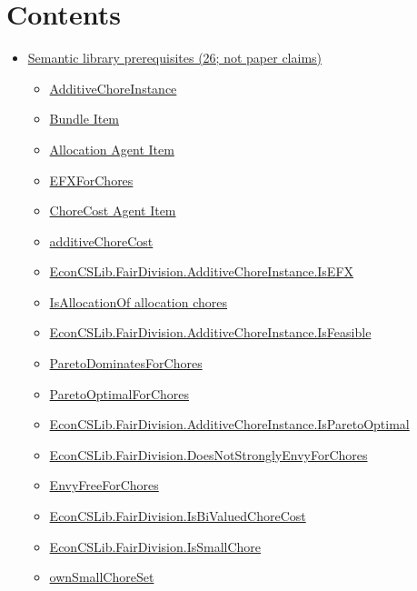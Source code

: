 \documentclass[10pt]{article}
\begin{document}
\section*{Contents}
\begin{itemize}[leftmargin=1.2em]
\item \hyperlink{library-section-de5e5601682a1524}{Semantic library prerequisites (26; not paper claims)}
\begin{itemize}[leftmargin=1.2em]
\item \hyperlink{library-prerequisite-5a2d10cb5db86b3a}{AdditiveChoreInstance}
\item \hyperlink{library-prerequisite-3240074e96589b21}{Bundle Item}
\item \hyperlink{library-prerequisite-9933ac127bcc0808}{Allocation Agent Item}
\item \hyperlink{library-prerequisite-0f08bb302d29f5c6}{EFXForChores}
\item \hyperlink{library-prerequisite-4249211ce100f713}{ChoreCost Agent Item}
\item \hyperlink{library-prerequisite-7bff1a0ffca2fbc8}{additiveChoreCost}
\item \hyperlink{library-prerequisite-de6ce80db7947acf}{EconCSLib.FairDivision.AdditiveChoreInstance.IsEFX}
\item \hyperlink{library-prerequisite-272962efb2ddede6}{IsAllocationOf allocation chores}
\item \hyperlink{library-prerequisite-c86819508edcb6d0}{EconCSLib.FairDivision.AdditiveChoreInstance.IsFeasible}
\item \hyperlink{library-prerequisite-53807d5ecfc91999}{ParetoDominatesForChores}
\item \hyperlink{library-prerequisite-e50910ae4c5f1487}{ParetoOptimalForChores}
\item \hyperlink{library-prerequisite-9a8054c4d16718aa}{EconCSLib.FairDivision.AdditiveChoreInstance.IsParetoOptimal}
\item \hyperlink{library-prerequisite-0988b156f88eab26}{EconCSLib.FairDivision.DoesNotStronglyEnvyForChores}
\item \hyperlink{library-prerequisite-a6835599374e9c61}{EnvyFreeForChores}
\item \hyperlink{library-prerequisite-bff109e0f31c867f}{EconCSLib.FairDivision.IsBiValuedChoreCost}
\item \hyperlink{library-prerequisite-d5b3a13495d92097}{EconCSLib.FairDivision.IsSmallChore}
\item \hyperlink{library-prerequisite-cc7147176e4228f0}{ownSmallChoreSet}

\end{itemize}
\end{itemize}
\end{document}
